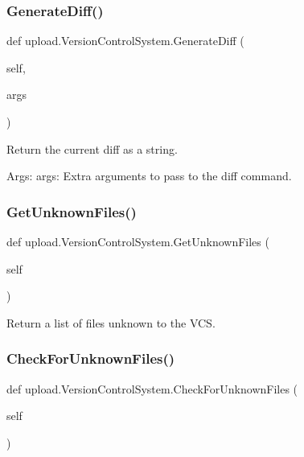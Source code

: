 \subsubsection{\texorpdfstring{Generate\+Diff()}{GenerateDiff()}}
{\footnotesize\ttfamily def upload.\+Version\+Control\+System.\+Generate\+Diff (\begin{DoxyParamCaption}\item[{}]{self,  }\item[{}]{args }\end{DoxyParamCaption})}

\begin{DoxyVerb}Return the current diff as a string.

Args:
  args: Extra arguments to pass to the diff command.
\end{DoxyVerb}
 \mbox{\label{classupload_1_1_version_control_system_a56a60e56aa9aff3df4001d2f84cab884}} 
\subsubsection{\texorpdfstring{Get\+Unknown\+Files()}{GetUnknownFiles()}}
{\footnotesize\ttfamily def upload.\+Version\+Control\+System.\+Get\+Unknown\+Files (\begin{DoxyParamCaption}\item[{}]{self }\end{DoxyParamCaption})}

\begin{DoxyVerb}Return a list of files unknown to the VCS.\end{DoxyVerb}
 \mbox{\label{classupload_1_1_version_control_system_ad2923d691a1b1047e9359c5b7c1c103f}} 
\subsubsection{\texorpdfstring{Check\+For\+Unknown\+Files()}{CheckForUnknownFiles()}}
{\footnotesize\ttfamily def upload.\+Version\+Control\+System.\+Check\+For\+Unknown\+Files (\begin{DoxyParamCaption}\item[{}]{self }\end{DoxyParamCaption})}

